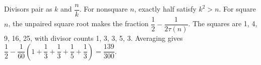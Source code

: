 Divisors pair as $ k $ and $\dfrac{n}{k}$. For nonsquare $ n $, exactly half satisfy $ k^2>n $. For square $ n $, the unpaired square root makes the fraction $\dfrac{1}{2}-\dfrac{1}{2\tau(n)}$. The squares are 1, 4, 9, 16, 25, with divisor counts 1, 3, 3, 5, 3. Averaging gives $\dfrac{1}{2}-\dfrac{1}{60}(1+\dfrac{1}{3}+\dfrac{1}{3}+\dfrac{1}{5}+\dfrac{1}{3})=\boxed{\dfrac{139}{300}}$.
